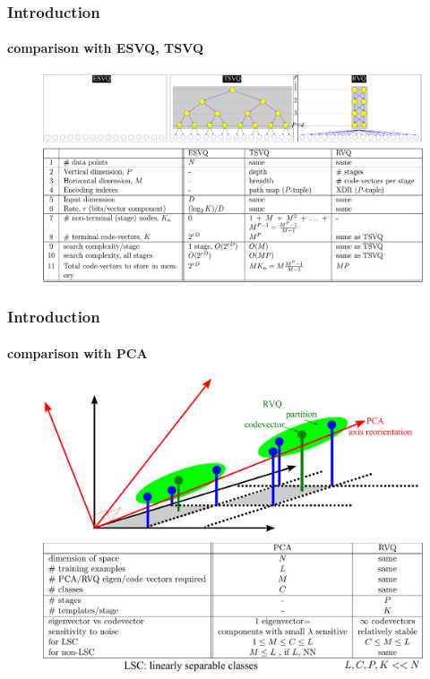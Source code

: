 \begin{frame}[plain]
\frametitle{Introduction}
\framesubtitle{comparison with ESVQ, TSVQ}
\logoCSIPCPL\mypagenum
	\begin{changemargin}{-1.3in}{0in}
		\begin{figure}				
			\includegraphics[width=1.3\textwidth]{figs/RVQ_comparisonWithESVQ_TSVQ.pdf}
		\end{figure}
	\end{changemargin}
\end{frame}


\begin{frame}[plain]
\frametitle{Introduction}
\framesubtitle{comparison with PCA}
\logoCSIPCPL\mypagenum
	\begin{changemargin}{-1.3in}{0in}
		\begin{figure}				
			\includegraphics[height=0.8\textheight]{figs/RVQ_comparisonWithPCA.pdf}
		\end{figure}
	\end{changemargin}
\end{frame}




